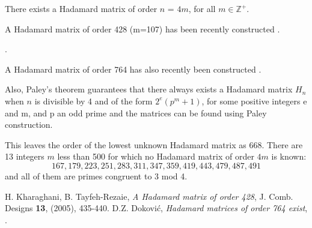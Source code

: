 \documentclass[12pt]{article}
\begin{document}

There exists a Hadamard matrix of order $n$ = $4m$, for all 
$m \in \mathbb{Z}^+.$

 A Hadamard matrix of order 428 (m=107) has been recently constructed \cite{KT}.

.

A Hadamard matrix of order 764 has also recently been constructed \cite{DZD}.

Also, Paley's theorem guarantees that there always exists a Hadamard matrix $H_n$ when $n$ is divisible by 4 and of the form $ 2^e(p^m+1) $, for some positive integers e and m, and p an odd prime and the matrices can be found using Paley construction. 

This leaves the order of the lowest unknown Hadamard matrix as 668.
There are 13 integers $m$ less than 500 for which no Hadamard matrix of order $4m$
is known:
$$
167, 179, 223, 251, 283, 311, 347, 359, 419, 443, 479, 487, 491
$$
and all of them are primes congruent to 3 mod 4.

\begin{thebibliography}{99}
 H. Kharaghani, B. Tayfeh-Rezaie, \emph{A Hadamard matrix of order 428}, J. Comb. 
Designs \textbf{13}, (2005), 435-440.
 D.Z. Dokovi\'c, \emph{Hadamard matrices of order 764 exist}, .
\end{thebibliography}
\end{document}
